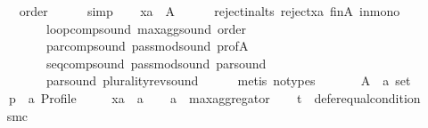\begin{isabellebody}
\ \ \ \ \isamarkupfalse%
\ order\isanewline
\ \ \ \ \isamarkupfalse%
\ simp\isanewline
\ \ \isamarkupfalse%
\ {\isachardoublequoteopen}xa\ {\isasymin}\ A{\isachardoublequoteclose}\isanewline
\ \ \ \ \isamarkupfalse%
\ reject{\isacharunderscore}{\kern0pt}in{\isacharunderscore}{\kern0pt}alts\ reject{\isacharunderscore}{\kern0pt}xa\ fin{\isacharunderscore}{\kern0pt}A\ in{\isacharunderscore}{\kern0pt}mono\isanewline
\ \ \ \ \ \ \ \ \ \ loop{\isacharunderscore}{\kern0pt}comp{\isacharunderscore}{\kern0pt}sound\ max{\isacharunderscore}{\kern0pt}agg{\isacharunderscore}{\kern0pt}sound\ order\isanewline
\ \ \ \ \ \ \ \ \ \ par{\isacharunderscore}{\kern0pt}comp{\isacharunderscore}{\kern0pt}sound\ pass{\isacharunderscore}{\kern0pt}mod{\isacharunderscore}{\kern0pt}sound\ prof{\isacharunderscore}{\kern0pt}A\isanewline
\ \ \ \ \ \ \ \ \ \ seq{\isacharunderscore}{\kern0pt}comp{\isacharunderscore}{\kern0pt}sound\ pass{\isacharunderscore}{\kern0pt}mod{\isacharunderscore}{\kern0pt}sound\ par{}{\isacharunderscore}{\kern0pt}sound\isanewline
\ \ \ \ \ \ \ \ \ \ par{}{\isacharunderscore}{\kern0pt}sound\ plurality{\isacharunderscore}{\kern0pt}rev{\isacharunderscore}{\kern0pt}sound\isanewline
\ \ \ \ \isamarkupfalse%
\ {\isacharparenleft}{\kern0pt}metis\ {\isacharparenleft}{\kern0pt}no{\isacharunderscore}{\kern0pt}types{\isacharparenright}{\kern0pt}{\isacharparenright}{\kern0pt}\isanewline
{}\isamarkupfalse%
\isanewline
\ \ \isamarkupfalse%
\isanewline
\ \ \ \ A\ {\isacharcolon}{\kern0pt}{\isacharcolon}{\kern0pt}\ {\isachardoublequoteopen}{\isacharprime}{\kern0pt}a\ set{\isachardoublequoteclose}\ \isanewline
\ \ \ \ p\ {\isacharcolon}{\kern0pt}{\isacharcolon}{\kern0pt}\ {\isachardoublequoteopen}{\isacharprime}{\kern0pt}a\ Profile{\isachardoublequoteclose}\ \isanewline
\ \ \ \ xa\ {\isacharcolon}{\kern0pt}{\isacharcolon}{\kern0pt}\ {\isachardoublequoteopen}{\isacharprime}{\kern0pt}a{\isachardoublequoteclose}\isanewline
\ \ \isamarkupfalse%
\ {\isacharquery}{\kern0pt}a\ {\isacharequal}{\kern0pt}\ {\isachardoublequoteopen}max{\isacharunderscore}{\kern0pt}aggregator{\isachardoublequoteclose}\isanewline
\ \ \isamarkupfalse%
\ {\isacharquery}{\kern0pt}t\ {\isacharequal}{\kern0pt}\ {\isachardoublequoteopen}defer{\isacharunderscore}{\kern0pt}equal{\isacharunderscore}{\kern0pt}condition{\isachardoublequoteclose}\isanewline
\ \ \isamarkupfalse%
\ {\isacharquery}{\kern0pt}smc\ {\isacharequal}{\kern0pt}\isanewline

\end{isabellebody}
